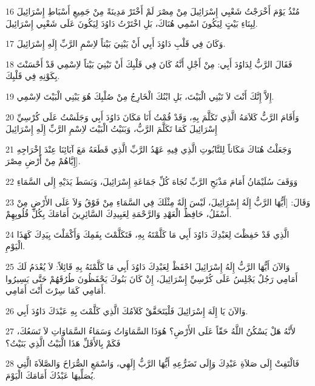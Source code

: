 \par 16 مُنْذُ يَوْمَ أَخْرَجْتُ شَعْبِي إِسْرَائِيلَ مِنْ مِصْرَ لَمْ أَخْتَرْ مَدِينَةً مِنْ جَمِيعِ أَسْبَاطِ إِسْرَائِيلَ لِبِنَاءِ بَيْتٍ لِيَكُونَ اسْمِي هُنَاكَ، بَلِ اخْتَرْتُ دَاوُدَ لِيَكُونَ عَلَى شَعْبِي إِسْرَائِيلَ.
\par 17 وَكَانَ فِي قَلْبِ دَاوُدَ أَبِي أَنْ يَبْنِيَ بَيْتاً لاِسْمِ الرَّبِّ إِلَهِ إِسْرَائِيلَ.
\par 18 فَقَالَ الرَّبُّ لِدَاوُدَ أَبِي: مِنْ أَجْلِ أَنَّهُ كَانَ فِي قَلْبِكَ أَنْ تَبْنِيَ بَيْتاً لاِسْمِي قَدْ أَحْسَنْتَ بِكَوْنِهِ فِي قَلْبِكَ.
\par 19 إِلاَّ إِنَّكَ أَنْتَ لاَ تَبْنِي الْبَيْتَ، بَلِ ابْنُكَ الْخَارِجُ مِنْ صُلْبِكَ هُوَ يَبْنِي الْبَيْتَ لاِسْمِي.
\par 20 وَأَقَامَ الرَّبُّ كَلاَمَهُ الَّذِي تَكَلَّمَ بِهِ، وَقَدْ قُمْتُ أَنَا مَكَانَ دَاوُدَ أَبِي وَجَلَسْتُ عَلَى كُرْسِيِّ إِسْرَائِيلَ كَمَا تَكَلَّمَ الرَّبُّ، وَبَنَيْتُ الْبَيْتَ لاِسْمِ الرَّبِّ إِلَهِ إِسْرَائِيلَ
\par 21 وَجَعَلْتُ هُنَاكَ مَكَاناً لِلتَّابُوتِ الَّذِي فِيهِ عَهْدُ الرَّبِّ الَّذِي قَطَعَهُ مَعَ آبَائِنَا عِنْدَ إِخْرَاجِهِ إِيَّاهُمْ مِنْ أَرْضِ مِصْرَ].
\par 22 وَوَقَفَ سُلَيْمَانُ أَمَامَ مَذْبَحِ الرَّبِّ تُجَاهَ كُلِّ جَمَاعَةِ إِسْرَائِيلَ، وَبَسَطَ يَدَيْهِ إِلَى السَّمَاءِ
\par 23 وَقَالَ: [أَيُّهَا الرَّبُّ إِلَهُ إِسْرَائِيلَ، لَيْسَ إِلَهٌ مِثْلَكَ فِي السَّمَاءِ مِنْ فَوْقُ وَلاَ عَلَى الأَرْضِ مِنْ أَسْفَلُ، حَافِظُ الْعَهْدِ وَالرَّحْمَةِ لِعَبِيدِكَ السَّائِرِينَ أَمَامَكَ بِكُلِّ قُلُوبِهِمْ.
\par 24 الَّذِي قَدْ حَفِظْتَ لِعَبْدِكَ دَاوُدَ أَبِي مَا كَلَّمْتَهُ بِهِ، فَتَكَلَّمْتَ بِفَمِكَ وَأَكْمَلْتَ بِيَدِكَ كَهَذَا الْيَوْمِ.
\par 25 وَالآنَ أَيُّهَا الرَّبُّ إِلَهُ إِسْرَائِيلَ احْفَظْ لِعَبْدِكَ دَاوُدَ أَبِي مَا كَلَّمْتَهُ بِهِ قَائِلاً: لاَ يُعْدَمُ لَكَ أَمَامِي رَجُلٌ يَجْلِسُ عَلَى كُرْسِيِّ إِسْرَائِيلَ، إِنْ كَانَ بَنُوكَ يَحْفَظُونَ طُرُقَهُمْ حَتَّى يَسِيرُوا أَمَامِي كَمَا سِرْتَ أَنْتَ أَمَامِي.
\par 26 وَالآنَ يَا إِلَهَ إِسْرَائِيلَ فَلْيَتَحَقَّقْ كَلاَمُكَ الَّذِي كَلَّمْتَ بِهِ عَبْدَكَ دَاوُدَ أَبِي.
\par 27 لأَنَّهُ هَلْ يَسْكُنُ اللَّهُ حَقّاً عَلَى الأَرْضِ؟ هُوَذَا السَّمَاوَاتُ وَسَمَاءُ السَّمَاوَاتِ لاَ تَسَعُكَ، فَكَمْ بِالأَقَلِّ هَذَا الْبَيْتُ الَّذِي بَنَيْتُ؟
\par 28 فَالْتَفِتْ إِلَى صَلاَةِ عَبْدِكَ وَإِلَى تَضَرُّعِهِ أَيُّهَا الرَّبُّ إِلَهِي، وَاسْمَعِ الصُّرَاخَ وَالصَّلاَةَ الَّتِي يُصَلِّيهَا عَبْدُكَ أَمَامَكَ الْيَوْمَ.
